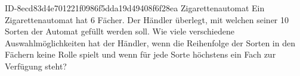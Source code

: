 \begin{exercise}
      {ID-8ecd83d4e701221f0986f5dda19d49408f6f28ea}
      {Zigarettenautomat}
  \ifproblem\problem
    Ein Zigarettenautomat hat 6 Fächer. Der Händler überlegt, mit welchen
    seiner 10 Sorten der Automat gefüllt werden soll. Wie viele verschiedene
    Auswahlmöglichkeiten hat der Händler, wenn die Reihenfolge der Sorten in
    den Fächern keine Rolle spielt und wenn für jede Sorte höchstens ein Fach
    zur Verfügung steht?
  \fi
\end{exercise}
